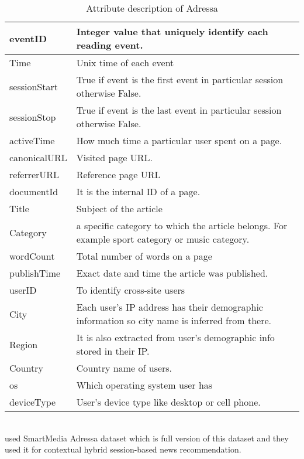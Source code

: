 \begin{table}[!htbp] 
\centering
\footnotesize
\def\arraystretch{1.4}%
\centering
\begin{tabular}{|p{2cm}|p{8cm}|}
\hline
eventID & Integer value that uniquely identify each reading event.
\\
\hline 
Time & Unix time of each event
\\
\hline 
sessionStart & True if event is the first event in particular session otherwise False. 
\\
\hline
sessionStop & True if event is the last event in particular session otherwise False. 
\\
\hline 
activeTime & How much time a particular user spent on a page.
\\
\hline
canonicalURL & Visited page URL.
\\
\hline
referrerURL & Reference page URL
\\
\hline 
documentId & It is the internal ID of a page.
\\
\hline 
Title & Subject of the article
\\
\hline 
Category & a specific category to which the article belongs. For example sport category or music category.
\\
\hline
wordCount & Total number of words on a page
\\
\hline 
publishTime & Exact date and time the article was published.
\\
\hline 
userID & To identify cross-site users
\\
\hline
City & Each user's IP address has their demographic information so city name is inferred from there.
\\
\hline
Region & It is also extracted from user's demographic info stored in their IP.
\\
\hline 
Country & Country name of users.
\\
\hline 
os & Which operating system user has
\\
\hline 
deviceType & User's device type like desktop or cell phone. 
\\
\hline
\end{tabular}

\caption{Attribute description of Adressa}
\label{table:5}
\end{table}
\\
\cite{Adressa2} used SmartMedia Adressa dataset which is full version of this dataset and they used it for contextual hybrid session-based news recommendation.
